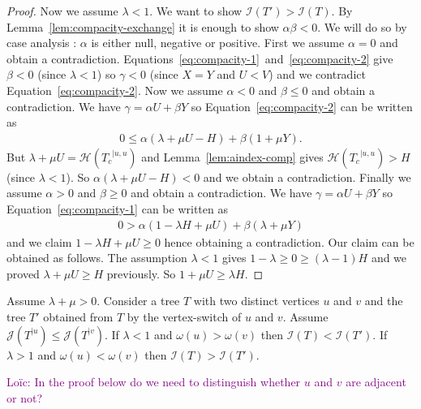 \documentclass[11 pt]{modarticle}
\newcommand{\wmap}{\omega}
\newcommand{\rtree}[2]{{#1}^{\lvert #2}}
\newcommand{\indexsymbol}{\mathcal{I}}
\newcommand{\tindex}[1]{\indexsymbol(#1)}
\newcommand{\rindexsymbol}{\mathcal{J}}
\newcommand{\rindex}[2]{\rindexsymbol(\rtree{#2}{#1})}
\newcommand{\aindexsymbol}{\mathcal{H}}
\newcommand{\aindex}[3]{\aindexsymbol(\rtree{#3}{#1, #2})}
\newcommand{\ldcomment}[1]{\textcolor{purple}{{\footnotesize Loïc:} #1}}
\begin{document}
\begin{proof}
Now we assume $\lambda < 1$. We want to show $\tindex{T'} > \tindex{T}$. By Lemma~\ref{lem:compacity-exchange} it is enough to show $\alpha \beta < 0$. We will do so by case analysis : $\alpha$ is either null, negative or positive. First we assume $\alpha = 0$ and obtain a contradiction. Equations~\eqref{eq:compacity-1}~and~\eqref{eq:compacity-2} give $\beta < 0$ (since $\lambda < 1$) so $\gamma < 0$ (since $X = Y$ and $U < V$) and we contradict Equation~\eqref{eq:compacity-2}. Now we assume $\alpha < 0$ and $\beta \leq 0$ and obtain a contradiction. We have $\gamma = \alpha U + \beta Y$ so Equation~\eqref{eq:compacity-2} can be written as
\begin{eqnarray*}
	0 \leq \alpha (\lambda + \mu U - H) + \beta (1 + \mu Y).
\end{eqnarray*}
But $\lambda + \mu U = \aindex{u}{u}{T_c}$ and Lemma~\ref{lem:aindex-comp} gives $\aindex{u}{u}{T_c} > H$ (since $\lambda < 1$). So $\alpha (\lambda + \mu U - H) < 0$ and we obtain a contradiction. Finally we assume $\alpha > 0$ and $\beta \geq 0$ and obtain a contradiction. We have $\gamma = \alpha U + \beta Y$ so Equation~\eqref{eq:compacity-1} can be written as
\begin{eqnarray*}
	0 > \alpha (1 - \lambda H + \mu U) + \beta (\lambda + \mu Y)
\end{eqnarray*}
and we claim $1 - \lambda H + \mu U \geq 0$ hence obtaining a contradiction. Our claim can be obtained as follows. The assumption $\lambda < 1$ gives $1 - \lambda \geq 0 \geq (\lambda - 1) H$ and we proved $\lambda + \mu U \geq H$ previously. So $1 + \mu U \geq \lambda H$.
\end{proof}

\begin{prop}\label{prop:compacity-wmap}
Assume $\lambda + \mu > 0$. Consider a tree $T$ with two distinct vertices $u$ and $v$ and the tree $T'$ obtained from $T$ by the vertex-switch of $u$ and $v$. Assume $\rindex{u}{T} \leq \rindex{v}{T}$. If $\lambda < 1$ and $\wmap(u) > \wmap(v)$ then $\tindex{T} < \tindex{T'}$. If $\lambda > 1$ and $\wmap(u) < \wmap(v)$ then $\tindex{T} > \tindex{T'}$.
\end{prop}

\ldcomment{In the proof below do we need to distinguish whether $u$ and $v$ are adjacent or not?}
\end{document}
